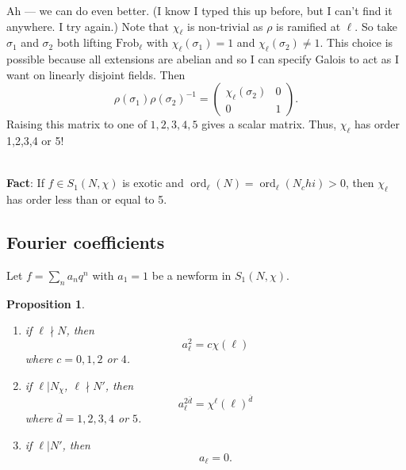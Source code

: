 \documentclass[11pt]{amsart}
\theoremstyle{plain}
\newtheorem{prop}[thm]{Proposition}
\theoremstyle{definition}
\DeclareMathOperator{\ord}{ord}
\newcommand{\Frob}{\text{Frob}}
\renewcommand{\[}{\left[}
\renewcommand{\]}{\right]}
\begin{document}
Ah --- we can do even better.  (I know I typed this up before, but I can't find it anywhere.  I try again.)  Note that $\chi_\ell$ is non-trivial as $\rho$ is ramified at $\ell$.  So take $\sigma_1$ and $\sigma_2$ both lifting $\Frob_\ell$ with $\chi_\ell(\sigma_1) = 1$ and $\chi_\ell(\sigma_2) \neq 1$.  This choice is possible because all extensions are abelian and so I can specify Galois to act as I want on linearly disjoint fields.  Then
$$
\rho(\sigma_1) \rho(\sigma_2)^{-1} = 
\begin{pmatrix}
\chi_{\ell}(\sigma_2)  & 0 \\
0 & 1
\end{pmatrix}.
$$
Raising this matrix to one of $1,2,3,4,5$ gives  a scalar matrix.  Thus, $\chi_\ell$ has order 1,2,3,4 or 5!  

~\\

{\bf Fact}: If $f \in S_1(N,\chi)$ is exotic and $\ord_\ell(N) = \ord_\ell(N_chi) > 0$, then $\chi_\ell$ has order less than or equal to 5.



\subsection{Fourier coefficients}

Let $f = \sum_n a_n q^n$ with $a_1=1$ be a newform in $S_1(N,\chi)$.\\

\begin{prop}~\\
\begin{enumerate}
\item if $\ell \nmid N$, then 
$$
a_\ell^2 = c \chi(\ell)
$$
where $c=0,1,2$ or $4$.

\item if $\ell | N_\chi$, $\ell \nmid N'$, then
$$
a_\ell^{2\overline{d}} = \chi^{\ell}(\ell)^{\overline{d}}
$$ 
where $\overline{d} = 1,2,3,4$ or $5$.

\item if $\ell | N'$, then
$$
a_\ell = 0.
$$
\end{enumerate}
\end{prop}
\end{document}
